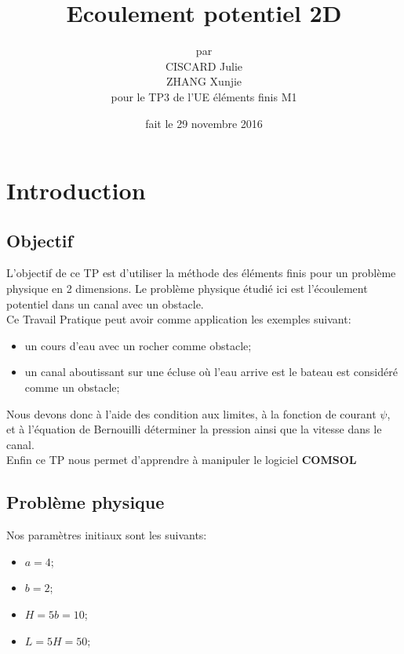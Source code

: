 \documentclass[a4paper,11pt]{report} %
\title{\textbf{Ecoulement potentiel 2D}} %
\author{par\\CISCARD Julie\\ZHANG Xunjie\\pour le TP3 de l'UE éléments finis M1} %
\date{fait le 29 novembre 2016} %
\begin{document}
\maketitle %
\tableofcontents %
\listoffigures %
\pagebreak

\section{Introduction}

\subsection{Objectif}

L'objectif de ce TP est d'utiliser la méthode des éléments finis pour un problème physique en 2 dimensions. Le problème physique étudié ici est l'écoulement potentiel dans un canal avec un obstacle.\\

Ce Travail Pratique peut avoir comme application les exemples suivant:
\begin{itemize} 
   \item un cours d'eau avec un rocher comme obstacle;
   \item un canal aboutissant sur une écluse où l'eau arrive est le bateau est considéré comme un obstacle;
\end{itemize}

Nous devons donc à l'aide des condition aux limites, à la fonction de courant $\psi$, et à l'équation de Bernouilli déterminer la pression ainsi que la vitesse dans le canal.\\

Enfin ce TP nous permet d'apprendre à manipuler le logiciel \textbf{COMSOL}

\subsection{Problème physique}

Nos paramètres initiaux sont les suivants:
\begin{itemize}
	\item $a=4$;
	\item $b=2$;
	\item $H=5b=10$;
	\item $L=5H=50$;
\end{itemize}
\end{document}

